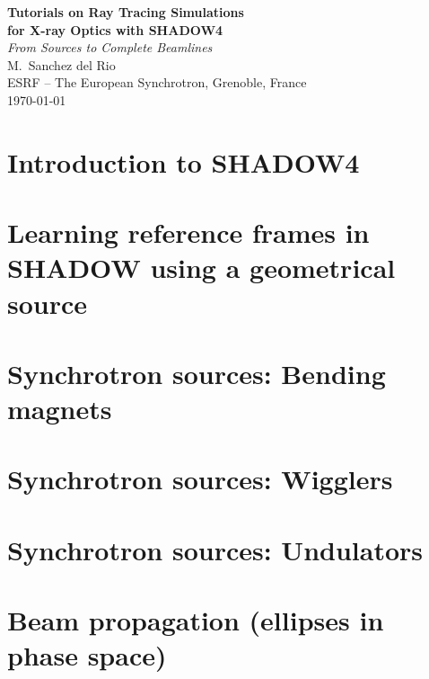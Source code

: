 \documentclass[12pt,a4paper]{article}
\begin{document}

\begin{titlepage}
  \centering
  \vspace*{2cm}
  {\huge\bfseries Tutorials on Ray Tracing Simulations\\[0.4em]
   for X-ray Optics with SHADOW4}\\[1.5em]
  {\large\itshape From Sources to Complete Beamlines}\\[2em]
  {\normalsize M.\ Sanchez del Rio\\[0.5em]
   ESRF -- The European Synchrotron, Grenoble, France}\\[4em]
  {\normalsize\today}
  \vfill
\end{titlepage}

\tableofcontents

\newpage
\section{Introduction to SHADOW4}



\newpage
\section{Learning reference frames in SHADOW using a geometrical source}



\newpage
\section{Synchrotron sources: Bending magnets}



\newpage
\section{Synchrotron sources: Wigglers}



\newpage
\section{Synchrotron sources: Undulators}



\newpage
\section{Beam propagation (ellipses in phase space)}


\end{document}
